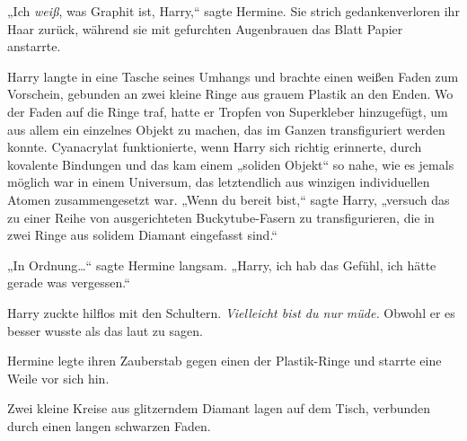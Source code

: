 „Ich \emph{weiß}, was Graphit ist, Harry,“ sagte Hermine. Sie strich gedankenverloren ihr Haar zurück, während sie mit gefurchten Augenbrauen das Blatt Papier anstarrte.

Harry langte in eine Tasche seines Umhangs und brachte einen weißen Faden zum Vorschein, gebunden an zwei kleine Ringe aus grauem Plastik an den Enden. Wo der Faden auf die Ringe traf, hatte er Tropfen von Superkleber hinzugefügt, um aus allem ein einzelnes Objekt zu machen, das im Ganzen transfiguriert werden konnte. Cyanacrylat funktionierte, wenn Harry sich richtig erinnerte, durch kovalente Bindungen und das kam einem „soliden Objekt“ so nahe, wie es jemals möglich war in einem Universum, das letztendlich aus winzigen individuellen Atomen zusammengesetzt war. „Wenn du bereit bist,“ sagte Harry, „versuch das zu einer Reihe von ausgerichteten Buckytube-Fasern zu transfigurieren, die in zwei Ringe aus solidem Diamant eingefasst sind.“

„In Ordnung…“ sagte Hermine langsam. „Harry, ich hab das Gefühl, ich hätte gerade was vergessen.“

Harry zuckte hilflos mit den Schultern. \emph{Vielleicht bist du nur müde.} Obwohl er es besser wusste als das laut zu sagen.

Hermine legte ihren Zauberstab gegen einen der Plastik-Ringe und starrte eine Weile vor sich hin.

Zwei kleine Kreise aus glitzerndem Diamant lagen auf dem Tisch, verbunden durch einen langen schwarzen Faden.

